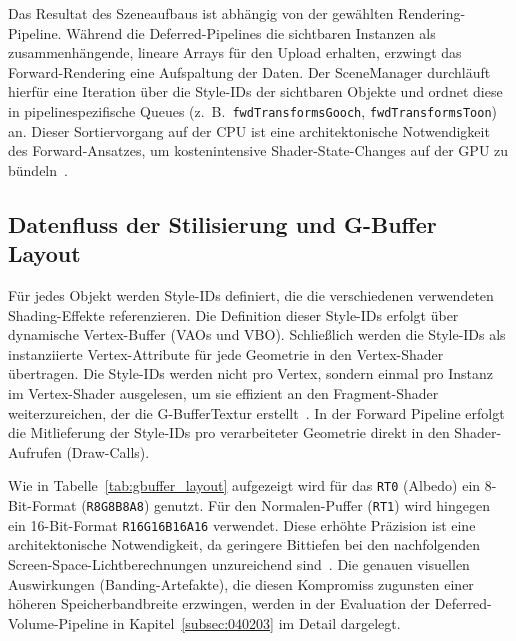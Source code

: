 Das Resultat des Szeneaufbaus ist abhängig von der gewählten Rendering-Pipeline.
Während die Deferred-Pipelines die sichtbaren Instanzen als zusammenhängende, lineare Arrays für den Upload erhalten,
erzwingt das Forward-Rendering eine Aufspaltung der Daten.
Der SceneManager durchläuft hierfür eine Iteration über die Style-IDs der sichtbaren Objekte und ordnet diese in
pipelinespezifische Queues (z.\ B.\ \texttt{fwdTransformsGooch}, \texttt{fwdTransformsToon}) an.
Dieser Sortiervorgang auf der \ac{CPU} ist eine architektonische Notwendigkeit des Forward-Ansatzes, um
kostenintensive Shader-State-Changes auf der \ac{GPU} zu
bündeln~\cite[S.~795 u. S.~886]{akenine-mollerRealtimeRendering2019}.

\subsection{Datenfluss der Stilisierung und G-Buffer Layout}
\label{subsec:040103_g-buffer_layout}

Für jedes Objekt werden Style-IDs definiert, die die verschiedenen verwendeten Shading-Effekte referenzieren.
Die Definition dieser Style-IDs erfolgt über dynamische Vertex-Buffer (\ac{VAO}s und \ac{VBO}).
Schließlich werden die Style-IDs als instanziierte Vertex-Attribute für jede Geometrie in den Vertex-Shader
übertragen.
Die Style-IDs werden nicht pro Vertex, sondern einmal pro Instanz im Vertex-Shader ausgelesen, um sie
effizient an den Fragment-Shader weiterzureichen, der die \ac{G-Buffer}Textur
erstellt~\cite[S.~797-798]{akenine-mollerRealtimeRendering2019}.
In der Forward Pipeline erfolgt die Mitlieferung der Style-IDs pro verarbeiteter Geometrie direkt in den
Shader-Aufrufen (Draw-Calls).

Wie in Tabelle~\ref{tab:gbuffer_layout} aufgezeigt wird für das \texttt{\ac{RT}0} (Albedo) ein 8-Bit-Format
(\texttt{R8G8B8A8}) genutzt.
Für den Normalen-Puffer (\texttt{\ac{RT}1}) wird hingegen ein 16-Bit-Format \texttt{R16G16B16A16} verwendet.
Diese erhöhte Präzision ist eine architektonische Notwendigkeit, da geringere Bittiefen bei den nachfolgenden
Screen-Space-Lichtberechnungen unzureichend sind~\cite[Folie~37]{AdvancesRealTimeRendering}.
Die genauen visuellen Auswirkungen (Banding-Artefakte), die diesen Kompromiss zugunsten einer höheren Speicherbandbreite
erzwingen, werden in der Evaluation der Deferred-Volume-Pipeline in Kapitel~\ref{subsec:040203} im Detail dargelegt.

